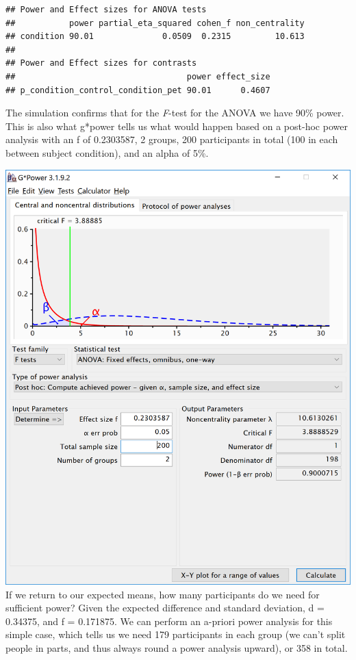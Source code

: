 \documentclass[]{book}
\begin{document}
\begin{verbatim}
## Power and Effect sizes for ANOVA tests
##           power partial_eta_squared cohen_f non_centrality
## condition 90.01              0.0509  0.2315         10.613
## 
## Power and Effect sizes for contrasts
##                                   power effect_size
## p_condition_control_condition_pet 90.01      0.4607
\end{verbatim}

The simulation confirms that for the \emph{F}-test for the ANOVA we have 90\% power. This is also what g*power tells us what would happen based on a post-hoc power analysis with an f of 0.2303587, 2 groups, 200 participants in total (100 in each between subject condition), and an alpha of 5\%.

\includegraphics{screenshots/gpower_8.png}
If we return to our expected means, how many participants do we need for sufficient power? Given the expected difference and standard deviation, d = 0.34375, and f = 0.171875. We can perform an a-priori power analysis for this simple case, which tells us we need 179 participants in each group (we can't split people in parts, and thus always round a power analysis upward), or 358 in total.
\end{document}
